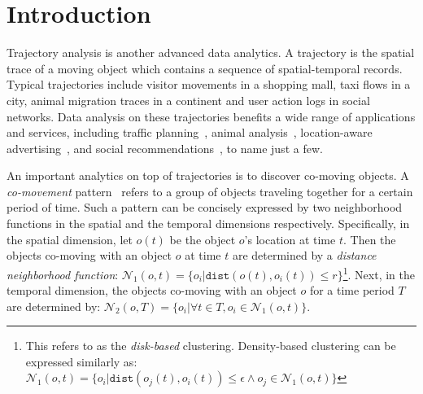 \section{Introduction}
Trajectory analysis is another advanced data analytics. A trajectory is the spatial trace
of a moving object which contains a sequence of spatial-temporal records. Typical trajectories
include visitor movements in a shopping mall, taxi flows in a city, animal migration traces in a continent and user action logs in social networks.
Data analysis on these trajectories benefits a wide range of applications and services, including traffic planning~\cite{zheng2011urban}, animal analysis~\cite{li2010miningperiodic}, location-aware advertising~\cite{guo2016influence}, and social recommendations~\cite{bao2013survey}, to name just a few. 

An important analytics on top of trajectories is to discover co-moving objects. A \emph{co-movement} pattern~\cite{li2013onlinegroup,zheng2015trajectory} 
refers to a group of objects traveling together for a certain period of time.
Such a pattern can be concisely expressed by two neighborhood functions in the spatial and the temporal dimensions respectively.
Specifically, in the spatial dimension, let $o(t)$ be the object $o$'s location at time $t$.
Then the objects co-moving with an object $o$
at time $t$ are determined by a 
\emph{distance neighborhood function}:
$\mathcal{N}_1(o,t) = \{o_i | \mathtt{dist}(o(t), o_i(t)) \leq r \}$\footnote{This refers to as the \emph{disk-based} clustering. Density-based clustering can be expressed similarly as: $\mathcal{N}_1(o,t) = \{o_i | \mathtt{dist}(o_j(t), o_i(t)) \leq \epsilon \wedge o_j \in \mathcal{N}_1(o,t) \}$}. Next, in the temporal dimension, the objects co-moving with an object $o$ for a time period $T$ are determined by: $\mathcal{N}_2(o, T) = \{o_i | \forall t \in T, o_i \in \mathcal{N}_1(o,t)\}$.
%

